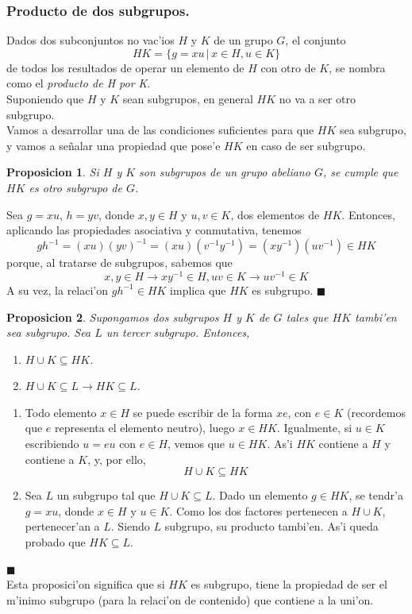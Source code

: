 \documentclass[a4paper,openright,12pt]{report}
\numberwithin{equation}{section} %
\newtheorem{proposicion}{Proposicion}[section] %
\newenvironment{proof}{\noindent{\it Demostracion:}}{\hfill$\blacksquare$} %
\begin{document}
\subsubsection{Producto de dos subgrupos.}
Dados dos subconjuntos no vac'ios $H$ y $K$ de un grupo $G$, el conjunto
\[
HK=\{ g=xu \, | \, x \in H,u\in K \}
\]
de todos los resultados de operar un elemento de $H$ con otro de $K$, se nombra como el \textit{producto de H por K}.\\
Suponiendo que $H$ y $K$ sean subgrupos, en general $HK$ no va a ser otro subgrupo.\\
Vamos a desarrollar una de las condiciones suficientes para que $HK$ sea subgrupo, y vamos a se\~nalar una propiedad que pose'e $HK$ en caso de ser subgrupo.
\begin{proposicion}
Si $H$ y $K$ son subgrupos de un grupo abeliano $G$, se cumple que $HK$ es otro subgrupo de $G$.
\end{proposicion}
\begin{proof}
Sea $g=xu$, $h=yv$, donde $x,y \in H$ y $u,v \in K$, dos elementos de $HK$. Entonces, aplicando las propiedades asociativa y conmutativa, tenemos
\[
gh^{-1}=(xu)(yv)^{-1}=(xu)(v^{-1}y^{-1})=(xy^{-1})(uv^{-1})\in HK
\]
porque, al tratarse de subgrupos, sabemos que
\[
x,y \in H \rightarrow xy^{-1}\in H,uv\in K \rightarrow uv^{-1}\in K
\]
A su vez, la relaci'on $gh^{-1}\in HK$ implica que $HK$ es subgrupo.
\end{proof}
\begin{proposicion}
Supongamos dos subgrupos $H$ y $K$ de $G$ tales que $HK$ tambi'en sea subgrupo. Sea $L$ un tercer subgrupo. Entonces,
\begin{enumerate}
\item $H \cup K \subseteq HK$.
\item $H \cup K \subseteq L \rightarrow HK \subseteq L$.
\end{enumerate}
\end{proposicion}
\begin{proof}
\begin{enumerate}
\item Todo elemento $x \in H$ se puede escribir de la forma $xe$, con $e \in K$ (recordemos que $e$ representa el elemento neutro), luego $x\in HK$. Igualmente, si $u \in K$ escribiendo $u=eu$ con $e \in H$, vemos que $u \in HK$. As'i $HK$ contiene a $H$ y contiene a $K$, y, por ello, 
\[
H \cup K \subseteq HK
\]
\item Sea $L$ un subgrupo tal que $H \cup K \subseteq L$. Dado un elemento $g \in HK$, se tendr'a $g=xu$, donde $x \in H$ y $u \in K$. Como los dos factores pertenecen a $H \cup K$, pertenecer'an a $L$. Siendo $L$ subgrupo, su producto tambi'en. As'i queda probado que $HK \subseteq L$.
\end{enumerate}
\end{proof}
\\
Esta proposici'on significa que si $HK$ es subgrupo, tiene la propiedad de ser el m'inimo subgrupo (para la relaci'on de contenido) que contiene a la uni'on.
\end{document}
